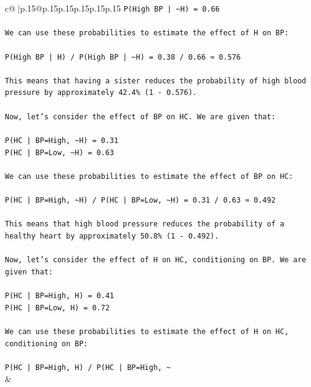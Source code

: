 \documentclass{article}
\begin{document}
{\begin{supertabular}{c@{$\;$}|p{.15\linewidth}@{}p{.15\linewidth}p{.15\linewidth}p{.15\linewidth}p{.15\linewidth}p{.15\linewidth}}
{{{\texttt{P(High BP | \textasciitilde{}H) = 0.66} \\
\\ 
\texttt{We can use these probabilities to estimate the effect of H on BP:} \\
\\ 
\texttt{P(High BP | H) / P(High BP | \textasciitilde{}H) = 0.38 / 0.66 ≈ 0.576} \\
\\ 
\texttt{This means that having a sister reduces the probability of high blood pressure by approximately 42.4\% (1 {-} 0.576).} \\
\\ 
\texttt{Now, let's consider the effect of BP on HC. We are given that:} \\
\\ 
\texttt{P(HC | BP=High, \textasciitilde{}H) = 0.31} \\
\texttt{P(HC | BP=Low, \textasciitilde{}H) = 0.63} \\
\\ 
\texttt{We can use these probabilities to estimate the effect of BP on HC:} \\
\\ 
\texttt{P(HC | BP=High, \textasciitilde{}H) / P(HC | BP=Low, \textasciitilde{}H) = 0.31 / 0.63 ≈ 0.492} \\
\\ 
\texttt{This means that high blood pressure reduces the probability of a healthy heart by approximately 50.8\% (1 {-} 0.492).} \\
\\ 
\texttt{Now, let's consider the effect of H on HC, conditioning on BP. We are given that:} \\
\\ 
\texttt{P(HC | BP=High, H) = 0.41} \\
\texttt{P(HC | BP=Low, H) = 0.72} \\
\\ 
\texttt{We can use these probabilities to estimate the effect of H on HC, conditioning on BP:} \\
\\ 
\texttt{P(HC | BP=High, H) / P(HC | BP=High, \textasciitilde{}} \\
            }
        }
    }
    & \\ \\


\end{supertabular}}
\end{document}

